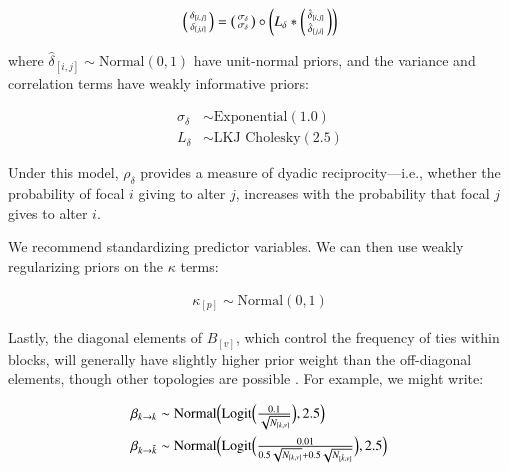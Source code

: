 \documentclass[Afour,sageh,times]{sagej}
\begin{document}
\begin{ceqn}
\begin{equation}
 \begin{psmallmatrix}
\delta_{[i,j]} \\
\delta_{[j,i]}
\end{psmallmatrix}
 =  \begin{psmallmatrix}
\sigma_\delta\\
\sigma_\delta
\end{psmallmatrix} \circ \left(L_\delta*  \begin{psmallmatrix}
\hat\delta_{[i,j]} \\
\hat\delta_{[j,i]}
\end{psmallmatrix}\right)
\end{equation}
\end{ceqn}
where $\hat\delta_{[i,j]}\sim \text {Normal}(0,1)$ have unit-normal priors, and the variance and correlation terms have weakly informative priors:

\begin{ceqn}
\begin{align}
\sigma_\delta &\sim \text {Exponential}(1.0)\label{bob89}\\
L_\delta &\sim \text {LKJ Cholesky}(2.5)\label{bob89L}
\end{align}
\end{ceqn}

Under this model, $\rho_\delta$ provides a measure of dyadic reciprocity---i.e., whether the probability of focal $i$ giving to alter $j$, increases with the probability that focal $j$ gives to alter $i$.

We recommend standardizing predictor variables. We can then use weakly regularizing priors on the $\kappa$ terms:
\begin{ceqn}
\begin{align}\label{booyaaaa}
\kappa_{[p]} \sim \text{Normal}(0, 1)
\end{align}
\end{ceqn}

Lastly, the diagonal elements of $B_{[v]}$, which control the frequency of ties within blocks, will generally have slightly higher prior weight than the off-diagonal elements, though other topologies are possible \citep[see][]{batagelj1997notes}. For example, we might write:
\begin{ceqn}
\begin{align}
	\beta_{k \to k} &\sim \mathrm{Normal}\Big( \text{Logit}\Big(\tfrac{0.1}{\sqrt{N_{[k,v]}}}\Big) , 2.5 \Big)\label{eq1zz1} \\
	\beta_{k \to \tilde k} &\sim \mathrm{Normal}\Big( \text{Logit}\Big(\tfrac{0.01}{0.5\sqrt{\vphantom{N_{\tilde k}}N_{[k,v]}}+0.5\sqrt{\vphantom{N_{\tilde k}}N_{[\tilde k,v]}}}\Big) , 2.5 \Big)\label{eq1zz2}
\end{align}
\end{ceqn}
\end{document}
